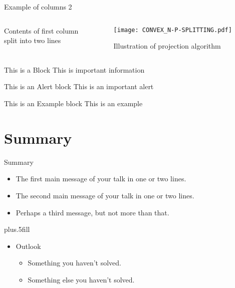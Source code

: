 \documentclass[10pt]{beamer}
\begin{document}
\begin{frame}{Example of columns 2}
     \begin{columns}[T] %
     \begin{column}[T]{5cm} %
     Contents of first column \\ split into two lines
     \end{column}
     \begin{column}[T]{5cm} %
          \begin{figure}
          \centering{}\texttt{[image: CONVEX\_N-P-SPLITTING.pdf]}\caption{Illustration of projection algorithm}
          \end{figure}
     \end{column}
     \end{columns}
\end{frame}


\begin{frame}

   \begin{block}{This is a Block}
      This is important information
   \end{block}

   \begin{alertblock}{This is an Alert block}
   This is an important alert
   \end{alertblock}

   \begin{exampleblock}{This is an Example block}
   This is an example 
   \end{exampleblock}

\end{frame}


\section*{Summary}

\begin{frame}{Summary}

  \begin{itemize}
  \item
    The \alert{first main message} of your talk in one or two lines.
  \item
    The \alert{second main message} of your talk in one or two lines.
  \item
    Perhaps a \alert{third message}, but not more than that.
  \end{itemize}
  
  \vskip0pt plus.5fill
  \begin{itemize}
  \item
    Outlook
    \begin{itemize}
    \item
      Something you haven't solved.
    \item
      Something else you haven't solved.
    \end{itemize}
  \end{itemize}
\end{frame}
\end{document}
